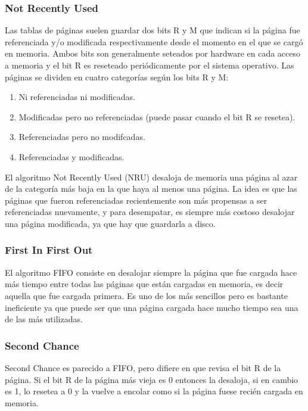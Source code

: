 \documentclass{article}
\begin{document}
\subsubsection{Not Recently Used}

Las tablas de p\'aginas suelen guardar dos bits R y M que indican si la p\'agina fue referenciada y/o modificada respectivamente desde el momento en el que se carg\'o en memoria. Ambos bits son generalmente seteados por hardware en cada acceso a memoria y el bit R es reseteado peri\'odicamente por el sistema operativo. Las p\'aginas se dividen en cuatro categor\'ias seg\'un los bits R y M:

\begin{enumerate}
\item Ni referenciadas ni modificadas.
\item Modificadas pero no referenciadas (puede pasar cuando el bit R se resetea).
\item Referenciadas pero no modifcadas.
\item Referenciadas y modificadas.
\end{enumerate}

El algoritmo Not Recently Used (NRU) desaloja de memoria una p\'agina al azar de la categor\'ia m\'as baja en la que haya al menos una p\'agina. La idea es que las p\'aginas que fueron referenciadas recientemente son m\'as propensas a ser referenciadas nuevamente, y para desempatar, es siempre m\'as costoso desalojar una p\'agina modificada, ya que hay que guardarla a disco.

\subsubsection{First In First Out}

El algoritmo FIFO consiste en desalojar siempre la p\'agina que fue cargada hace m\'as tiempo entre todas las p\'aginas que est\'an cargadas en memoria, es decir aquella que fue cargada primera. Es uno de los m\'as sencillos pero es bastante ineficiente ya que puede ser que una p\'agina cargada hace mucho tiempo sea una de las m\'as utilizadas.

\subsubsection{Second Chance}

Second Chance es parecido a FIFO, pero difiere en que revisa el bit R de la p\'agina. Si el bit R de la p\'agina m\'as vieja es 0 entonces la desaloja, si en cambio es 1, lo resetea a 0 y la vuelve a encolar como si la p\'agina fuese reci\'en cargada en memoria.
\end{document}
